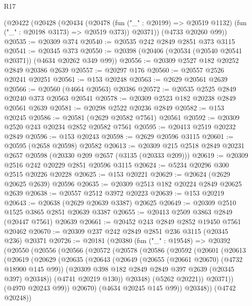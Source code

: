 \begin{lexlean}{R17}
\begin{coremodule}
    (@20422
      (@20428
        (@20434
          (@20478 (fun ("_" : @20199) => @20519 @1132) (fun ("_" : @20198 @3173) => @20519 @373))
          @20371))
      (@4733 @20260 @99))
@20535 := @20309 @374
@20540 := @20535 @242 @2849 @2851 @373 @3115
@20541 := @20345 @373
@20550 := @20398 (@20406 (@20534 (@20540 @20541 @20371)) (@4634 @20262 @349 @99))
@20556 := @20309 @2527 @182 @20252 @2849 @20386 @2639
@20557 := @20297 @176
@20560 := @20557 @2526 @20241 @20251
@20561 := @153 @20248
@20563 := @2629 @20561 @2639
@20566 := @20560 (@4664 @20563) @20386
@20572 := @20535 @2525 @2849 @20240 @373 @20563 @20541
@20578 := @20309 @2523 @182 @20238 @2849 @20561 @2639
@20581 := @20298 @2522 @20236 @2849
@20582 := @153 @20245
@20586 := @20581 (@2629 @20582 @7561) @20561
@20592 := @20309 @2520 @243 @20234 @2852 @20582 @7561
@20595 := @20413 @2519 @20232 @2849
@20596 := @153 @20243
@20598 := @2629 @20596 @3115
@20601 := @20595 (@2658 @20598) @20582
@20613 := @20309 @215 @2518 @2849 @20231 @2657 @20598 (@20330 @209 @2657 (@3135 (@20333 @209)))
@20619 := @20309 @2516 @242 @20229 @2851 @20596 @3115
@20624 := @5234 @20296 @300 @2515 @20226 @20228
@20625 := @153 @20221
@20629 := @20624 (@2629 @20625 @2639) @20596
@20635 := @20309 @2513 @182 @20224 @2849 @20625 @2639
@20638 := @20557 @2512 @3972 @20223
@20639 := @153 @20219
@20643 := @20638 (@2629 @20639 @3387) @20625
@20649 := @20309 @2510 @1525 @3865 @2851 @20639 @3387
@20655 := @20413 @2509 @3863 @2849 (@20447 @7561) @20639
@20661 := @20452 @243 @2849 @2852 @19450 @7561 @20462
@20670 := @20309 @237 @242 @2849 @2851 @236 @3115 (@20345 @236) @20371
@20726 := @20181
    (@20380
      (fun ("_" : @19548) =>
      @20392
        (@20550
          (@20556
            (@20566
              (@20572
                (@20578
                  (@20586
                    (@20592
                      (@20601
                        (@20613
                          (@20619
                            (@20629
                              (@20635
                                (@20643
                                  (@20649
                                    (@20655 (@20661 @20670) (@4732 @18900 @145 @99))
                                    (@20309 @398 @182 @2849 @2849 @397 @2639 (@20345 @397) @20348))
                                  (@4741 @20219 @130))
                                @20348)
                              (@5262 @20221))
                            @20371))
                        (@4970 @20243 @99))
                      @20670)
                    (@4634 @20245 @145 @99))
                  @20348))
              (@4742 @20248))

\end{coremodule}
\end{lexlean}
